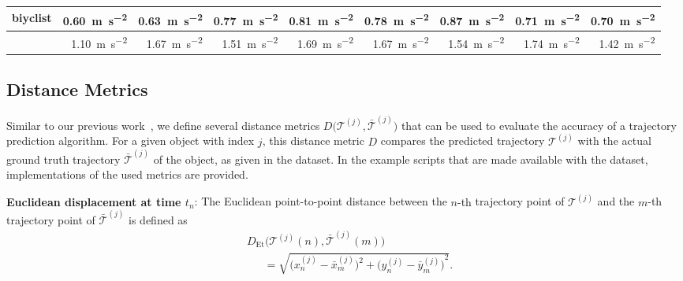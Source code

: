 \documentclass[a4paper, 10pt, conference]{ieeeconf}      %
\begin{document}
\begin{table}[t]
\begin{center}
\begin{tabular}{r|r|r|r|r|r|r|r||r}
        bi\textbf{y}clist & \SI{0,60}{\meter\per\square\second} & \SI{0,63}{\meter\per\square\second} & \SI{0,77}{\meter\per\square\second} & \SI{0,81}{\meter\per\square\second} & \SI{0,78}{\meter\per\square\second} & \SI{0,87}{\meter\per\square\second} & \SI{0,71}{\meter\per\square\second} & \SI{0,70}{\meter\per\square\second} \\
    \hline
                    & \SI{1,10}{\meter\per\square\second} & \SI{1,67}{\meter\per\square\second} & \SI{1,51}{\meter\per\square\second} & \SI{1,69}{\meter\per\square\second} & \SI{1,67}{\meter\per\square\second} & \SI{1,54}{\meter\per\square\second} & \SI{1,74}{\meter\per\square\second} & \SI{1,42}{\meter\per\square\second} \\
\end{tabular}
  \end{center}
\end{table}


\subsection{Distance Metrics}
Similar to our previous work~\cite{breuer_analysis_2019}, we define several distance metrics $D\big(\mathcal T^{(j)}, \bar{\mathcal T}^{(j)}\big)$ that can be used to evaluate the accuracy of a trajectory prediction algorithm.
For a given object with index $j$, this distance metric $D$ compares the predicted trajectory $\mathcal T^{(j)}$ with the actual ground truth trajectory $\bar{\mathcal T}^{(j)}$ of the object, as given in the dataset.
In the example scripts that are made available with the dataset, implementations of the used metrics are provided.

\textbf{Euclidean displacement at time $t_n$}:
The Euclidean point-to-point distance between the {$n$-th} trajectory point of $\mathcal T^{(j)}$ and the $m$-th trajectory point of $\bar{\mathcal T}^{(j)}$ is defined as
\begin{equation} \label{eq:euclideanDisplacement}
   \begin{split}
      &D_{{\mathrm{Et}}}\bigg(\mathcal T^{(j)}(n), \bar{\mathcal T}^{(j)}(m)\bigg) \\
      &~~~~~~~= \sqrt{{\Big(x_n^{(j)}-\bar{x}_m^{(j)}\Big)^2
      +{{\Big(y_n^{(j)}-\bar{y}_m^{(j)}\Big)}^2}}}.
   \end{split}
\end{equation}
\end{document}
